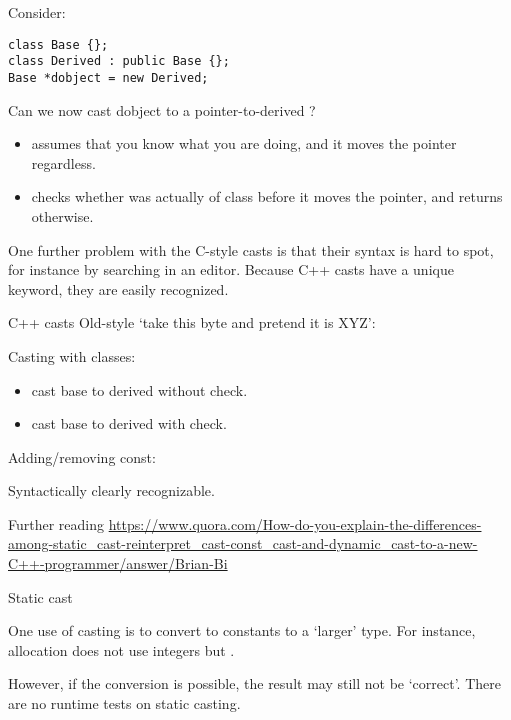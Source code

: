 Consider:
\begin{lstlisting}
class Base {};
class Derived : public Base {};
Base *dobject = new Derived;
\end{lstlisting}
Can we now cast dobject to a pointer-to-derived ?
\begin{itemize}
\item {} assumes that you know what you are
  doing, and it moves the pointer regardless.
\item {} checks whether  was
  actually of class  before it moves the pointer, and
  returns  otherwise.
\end{itemize}

\begin{remark}
  One further problem with the C-style casts is that their syntax is
  hard to spot, for instance by searching in an editor.
  Because C++ casts have a unique keyword, they are easily recognized.
\end{remark}

\begin{slide}{C++ casts}
  \label{sl:cpp-casts}
  Old-style `take this byte and pretend it is XYZ':
  
  Casting with classes:
  \begin{itemize}
  \item {} cast base to derived without check.
  \item {} cast base to derived with check.
  \end{itemize}
  Adding/removing const: 

  Syntactically clearly recognizable.
\end{slide}

Further reading \url{https://www.quora.com/How-do-you-explain-the-differences-among-static_cast-reinterpret_cast-const_cast-and-dynamic_cast-to-a-new-C++-programmer/answer/Brian-Bi}

 {Static cast}

One use of casting is to convert to constants to a `larger' type. For
instance, allocation does not use integers but .


However, if the
conversion is possible, the result may still not be `correct'.
%
%
There are no runtime tests on static casting.

